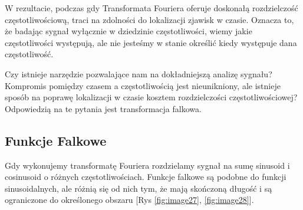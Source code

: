 W rezultacie, podczas gdy Transformata Fouriera oferuje doskonałą rozdzielczość częstotliwościową, traci na zdolności do lokalizacji zjawisk w czasie. Oznacza to, że badając sygnał wyłącznie w dziedzinie częstotliwości, wiemy jakie częstotliwości występują, ale nie jesteśmy w stanie określić kiedy występuje dana częstotliwość.

Czy istnieje narzędzie pozwalające nam na dokładniejszą analizę sygnału? Kompromis pomiędzy czasem a częstotliwością jest nieunikniony, ale istnieje sposób na poprawę lokalizacji w czasie kosztem rozdzielczości częstotliwościowej? Odpowiedzią na te pytania jest transformacja falkowa.


\subsection*{Funkcje Falkowe}

Gdy wykonujemy transformatę Fouriera rozdzielamy sygnał na sumę sinusoid i cosinusoid o różnych częstotliwościach. Funkcje falkowe są podobne do funkcji sinusoidalnych, ale różnią się od nich tym, że mają skończoną długość i są ograniczone do określonego obszaru [Rys \ref{fig:image27}, \ref{fig:image28}].

